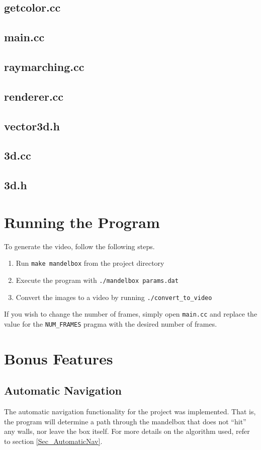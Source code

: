 \documentclass[11pt]{article}
\begin{document}
\subsection{getcolor.cc}


\subsection{main.cc}


\subsection{raymarching.cc}


\subsection{renderer.cc}


\subsection{vector3d.h}


\subsection{3d.cc}


\subsection{3d.h}


\section{Running the Program}
To generate the video, follow the following steps.
\begin{enumerate}
\item Run \texttt{make mandelbox} from the project directory
\item Execute the program with \texttt{./mandelbox params.dat}
\item Convert the images to a video by running \texttt{./convert\_to\_video}
\end{enumerate}

If you wish to change the number of frames, simply open \texttt{main.cc} and replace the value for the \texttt{NUM\_FRAMES} pragma with the desired number of frames.

\section{Bonus Features}
\subsection{Automatic Navigation}
The automatic navigation functionality for the project was implemented. That is, the program will determine a path through the mandelbox that does not ``hit'' any walls, nor leave the box itself. For more details on the algorithm used, refer to section \ref{Sec_AutomaticNav}.
\end{document}
